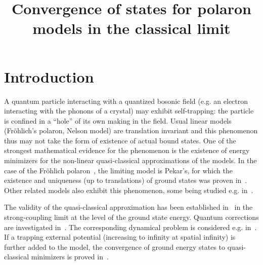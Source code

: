 \documentclass[AHL,Unicode,longabstracts,published]{cedram}
\title[Polaron models in the classical limit]{Convergence of states for polaron models in the classical limit}
\author[\initial{M.} \lastname{Falconi}]{\firstname{Marco} \lastname{Falconi}}
\author[\initial{A.} \lastname{Olgiati}]{\firstname{Alessandro} \lastname{Olgiati}}
\author[\initial{N.} \lastname{Rougerie}]{\firstname{Nicolas} \lastname{Rougerie}}
\newcommand{\1}{\mathds{1}}
\begin{document}
\maketitle


\section{Introduction}

A quantum particle interacting with a quantized bosonic field (e.g. an electron interacting with the phonons of a crystal) may exhibit self-trapping: the particle is confined in a ``hole'' of its own making in the field. Usual linear models (Fr\"ohlich's polaron, Nelson model) are translation invariant and this phenomenon thus may not take the form of existence of actual bound states. One of the strongest mathematical evidence for the phenomenon is the existence of energy minimizers for the non-linear quasi-classical approximations of the models. In the case of the Fr\"ohlich polaron~\cite{Moller-06,Seiringer-19}, the limiting model is Pekar's, for which the existence and uniqueness (up to translations) of ground states was proven in~\cite{Lieb-77,Lions-80}. Other related models also exhibit this phenomenon, some being studied e.g. in~\cite{BreFauPay-22a,BreFauPay-22b,FroJonLen-07b,FroJonLen-07,LewRou-13,LewRou-13b,Ricaud-14}.

The validity of the quasi-classical approximation has been established in~\cite{DonVar-83,LieTho-97,MiySpo-07} in the strong-coupling limit at the level of the ground state energy. Quantum corrections are investigated in~\cite{BroSei-22,FraSei-19,FelSei-21}. The corresponding dynamical problem is considered e.g. in~\cite{CorFalOli-19,FalLeoMitPet-21,
FraGan-17,GriSchSch-17,Griesemer-17,
LeoMitSei-20,
LeoRadSchSei-19}. If a trapping external potential (increasing to infinity at spatial infinity) is further added to the model, the convergence of ground energy states to quasi-classical minimizers is proved in~\cite{CorFalOli-20}.
\end{document}

